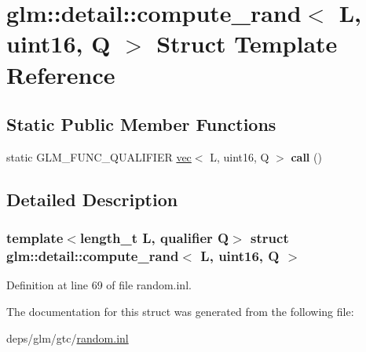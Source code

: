 \hypertarget{structglm_1_1detail_1_1compute__rand_3_01L_00_01uint16_00_01Q_01_4}{}\section{glm\+:\+:detail\+:\+:compute\+\_\+rand$<$ L, uint16, Q $>$ Struct Template Reference}
\label{structglm_1_1detail_1_1compute__rand_3_01L_00_01uint16_00_01Q_01_4}
\subsection*{Static Public Member Functions}
\begin{DoxyCompactItemize}
\item 
\mbox{\label{structglm_1_1detail_1_1compute__rand_3_01L_00_01uint16_00_01Q_01_4_a3fd5ddfdeccd559f68aecf1e8074d24b}} 
static G\+L\+M\+\_\+\+F\+U\+N\+C\+\_\+\+Q\+U\+A\+L\+I\+F\+I\+ER \hyperlink{structglm_1_1vec}{vec}$<$ L, uint16, Q $>$ {\bfseries call} ()
\end{DoxyCompactItemize}


\subsection{Detailed Description}
\subsubsection*{template$<$length\+\_\+t L, qualifier Q$>$\newline
struct glm\+::detail\+::compute\+\_\+rand$<$ L, uint16, Q $>$}



Definition at line 69 of file random.\+inl.



The documentation for this struct was generated from the following file\+:\begin{DoxyCompactItemize}
\item 
deps/glm/gtc/\hyperlink{random_8inl}{random.\+inl}\end{DoxyCompactItemize}
